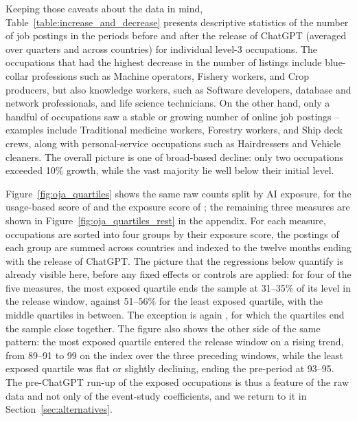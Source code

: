 \documentclass[11pt]{article}
\begin{document}
Keeping those caveats about the data in mind, Table~\ref{table:increase_and_decrease} presents descriptive statistics of the number of job postings in the periods before and after the release of ChatGPT (averaged over quarters and across countries) for individual level-3 occupations. The occupations that had the highest decrease in the number of listings include blue-collar professions such as Machine operators, Fishery workers, and Crop producers, but also knowledge workers, such as Software developers, database and network professionals, and life science technicians. On the other hand, only a handful of occupations saw a stable or growing number of online job postings -- examples include Traditional medicine workers, Forestry workers, and Ship deck crews, along with personal-service occupations such as Hairdressers and Vehicle cleaners. The overall picture is one of broad-based decline: only two occupations exceeded 10\% growth, while the vast majority lie well below their initial level.

Figure~\ref{fig:oja_quartiles} shows the same raw counts split by AI exposure, for the usage-based score of \citet{handa2025economic} and the exposure score of \citet{eloundou_gpts_2023}; the remaining three measures are shown in Figure~\ref{fig:oja_quartiles_rest} in the appendix. For each measure, occupations are sorted into four groups by their exposure score, the postings of each group are summed across countries and indexed to the twelve months ending with the release of ChatGPT. The picture that the regressions below quantify is already visible here, before any fixed effects or controls are applied: for four of the five measures, the most exposed quartile ends the sample at 31--35\% of its level in the release window, against 51--56\% for the least exposed quartile, with the middle quartiles in between. The exception is again \citet{webb_impact_2022}, for which the quartiles end the sample close together. The figure also shows the other side of the same pattern: the most exposed quartile entered the release window on a rising trend, from 89--91 to 99 on the index over the three preceding windows, while the least exposed quartile was flat or slightly declining, ending the pre-period at 93--95. The pre-ChatGPT run-up of the exposed occupations is thus a feature of the raw data and not only of the event-study coefficients, and we return to it in Section~\ref{sec:alternatives}.
\end{document}

